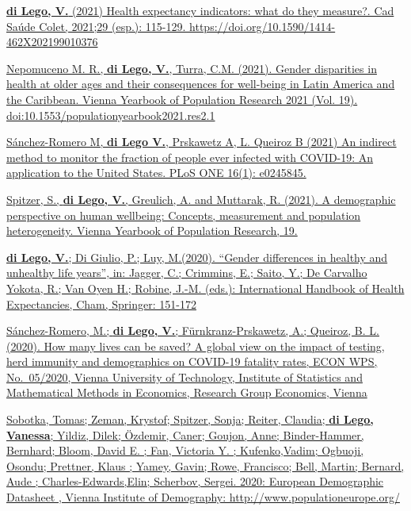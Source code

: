 \documentclass[
]{article}
\begin{document}
\href{https://www.scielo.br/j/cadsc/a/wc8DBFJs4jRfdR4DG4KT6YM/}{\textbf{di
Lego, V.} (2021) Health expectancy indicators: what do they measure?.
Cad Saúde Colet, 2021;29 (esp.): 115-129.
https://doi.org/10.1590/1414-462X202199010376}

\href{https://www.austriaca.at/0xc1aa5576_0x003c8cc2.pdf}{Nepomuceno M.
R., \textbf{di Lego, V.}, Turra, C.M. (2021). Gender disparities in
health at older ages and their consequences for well-being in Latin
America and the Caribbean. Vienna Yearbook of Population Research 2021
(Vol. 19). doi:10.1553/populationyearbook2021.res2.1}

\href{https://doi.org/10.1371/journal.pone.0245845}{Sánchez-Romero M,
\textbf{di Lego V.}, Prskawetz A, L. Queiroz B (2021) An indirect method
to monitor the fraction of people ever infected with COVID-19: An
application to the United States. PLoS ONE 16(1): e0245845.}

\href{https://doi.org/10.1553/populationyearbook2021.int01}{Spitzer, S.,
\textbf{di Lego, V.}, Greulich, A. and Muttarak, R. (2021). A
demographic perspective on human wellbeing: Concepts, measurement and
population heterogeneity. Vienna Yearbook of Population Research, 19.}

\href{https://link.springer.com/chapter/10.1007\%2F978-3-030-37668-0_11}{\textbf{di
Lego, V.}; Di Giulio, P.; Luy, M.(2020). ``Gender differences in healthy
and unhealthy life years'', in: Jagger, C.; Crimmins, E.; Saito, Y.; De
Carvalho Yokota, R.; Van Oyen H.; Robine, J.-M. (eds.): International
Handbook of Health Expectancies, Cham, Springer: 151-172}

\href{https://www.econstor.eu/bitstream/10419/218732/1/1698672055.pdf}{Sánchez-Romero,
M.; \textbf{di Lego, V.}; Fürnkranz-Prskawetz, A.; Queiroz, B. L.
(2020). How many lives can be saved? A global view on the impact of
testing, herd immunity and demographics on COVID-19 fatality rates, ECON
WPS, No.~05/2020, Vienna University of Technology, Institute of
Statistics and Mathematical Methods in Economics, Research Group
Economics, Vienna}

\href{https://www.oeaw.ac.at/vid/data/demographic-data-sheets/european-demographic-data-sheet-2020}{Sobotka,
Tomas; Zeman, Krystof; Spitzer, Sonja; Reiter, Claudia; \textbf{di Lego,
Vanessa}; Yildiz, Dilek; Özdemir, Caner; Goujon, Anne; Binder-Hammer,
Bernhard; Bloom, David E. ; Fan, Victoria Y. ; Kufenko,Vadim; Ogbuoji,
Osondu; Prettner, Klaus ; Yamey, Gavin; Rowe, Francisco; Bell, Martin;
Bernard, Aude ; Charles-Edwards,Elin; Scherbov, Sergei. 2020: European
Demographic Datasheet , Vienna Institute of Demography:
http://www.populationeurope.org/}
\end{document}
